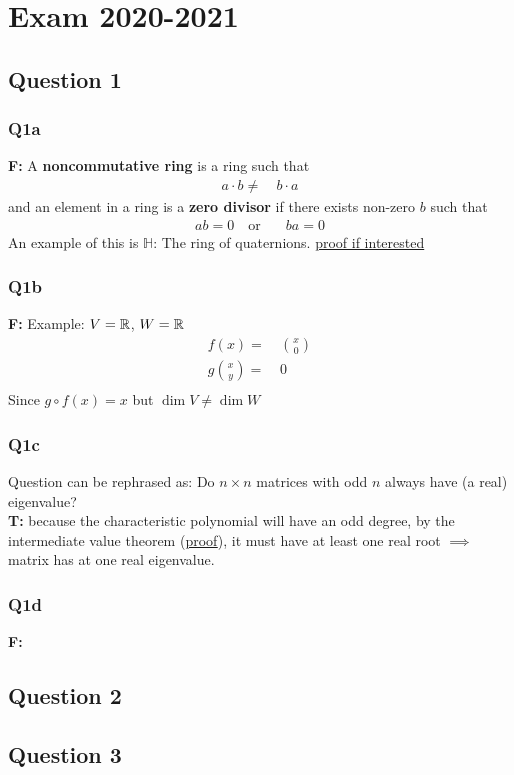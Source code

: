 \section{Exam 2020-2021}

\subsection{Question 1}
\subsubsection{Q1a}
\textbf{F:} A \textbf{noncommutative ring} is a ring such that 
\begin{align*}
	a\cdot b \neq&\ b\cdot a 
\end{align*}
and an element in a ring is a \textbf{zero divisor} if there exists non-zero $b$ such that 
\begin{align*}
	ab=0 \quad \text{or}&\quad ba=0
\end{align*}
An example of this is $\mathbb{H}$: The ring of quaternions. \href{https://mathsci2.appstate.edu/~sjg/class/3110/mathfestalg2000/quaternions.html#:~:text=abelian\%20under\%20multiplication.-,Quaternions\%20are\%20Not\%20an\%20Integral,but\%20have\%20no\%20zero\%2Ddivisors.}{proof if interested}
\subsubsection{Q1b}
\textbf{F:} Example: $V=\mathbb{R}$, $W=\mathbb{R}$
\begin{align*}
f(x)=&\ \binom{x}{0}	\\
g\binom{x}{y}=&\ 0	\\
\end{align*}
Since $g\circ f(x)=x$ but $\dim{V}\neq\dim{W}$


\subsubsection{Q1c}
Question can be rephrased as: Do $n\times n$ matrices with odd $n$ always have (a real) eigenvalue?\\
\noindent\textbf{T:} because the characteristic polynomial will have an odd degree, by the intermediate value theorem (\href{https://math.stackexchange.com/questions/689575/proof-that-every-polynomial-of-odd-degree-has-one-real-root}{proof}), it must have at least one real root $\implies$ matrix has at one real eigenvalue.
\subsubsection{Q1d}

\textbf{F:}



\subsection{Question 2}
\subsection{Question 3}